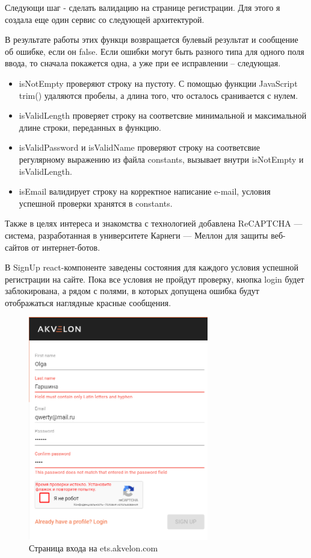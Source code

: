 \documentclass[a4paper,12pt]{diplom}
\begin{document}
Следующи шаг - сделать валидацию на странице регистрации. Для этого я создала еще один сервис со следующей архитектурой.
\medskip
{}
\medskip

В результате работы этих функци возвращается булевый результат и сообщение об ошибке, если он false.
Если ошибки могут быть разного типа для одного поля ввода, то сначала покажется одна, а уже при ее исправлении -- следующая.
\medskip

\begin{itemize}
  \item isNotEmpty проверяют строку на пустоту. С помощью функции JavaScript trim() удаляются пробелы, а длина того, что осталось сранивается с нулем.
  \item isValidLength проверяет строку на соответсвие минимальной и максимальной длине строки, переданных в функцию.
  \item isValidPassword и isValidName проверяют строку на соответсвие регулярному выражению из файла constants, вызывает внутри isNotEmpty и isValidLength.
  \item isEmail валидирует строку на корректное написание e-mail, условия успешной проверки хранятся в constants.
\end{itemize}

Также в целях интереса и знакомства с технологией добавлена ReCAPTCHA — система, разработанная в университете Карнеги — Меллон для защиты веб-сайтов от интернет-ботов.

В SignUp react-компоненте заведены состояния для каждого условия успешной регистрации на сайте. Пока все условия не пройдут проверку, кнопка login будет заблокирована,
а рядом с полями, в которых допущена ошибка будут отображаться наглядные красные сообщения.

\begin{figure}[!ht]
	\centering
	\includegraphics[width=0.7\textwidth]{resources/signup.png}
	\caption{Страница входа на ets.akvelon.com}
	\label{fig:1}
\end{figure}
\end{document}
